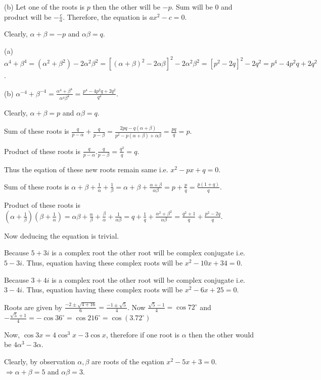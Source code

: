   (b) Let one of the roots is $p$ then the other will be $-p$. Sum will be $0$ and product will be
  $-\frac{c}{a}$. Therefore, the equation is $ax^2 - c = 0$.
\item Clearly, $\alpha + \beta = -p$ and $\alpha\beta = q$.

  (a) $\alpha^4 + \beta^4 = (\alpha^2 + \beta^2) - 2\alpha^2\beta^2 = [(\alpha + \beta)^2 - 2\alpha\beta]^2
  - 2\alpha^2\beta^2 = [p^2 - 2q]^2 - 2q^2 = p^4 - 4p^2q + 2q^2$.

  (b) $\alpha^{-4} + \beta^{-4} = \frac{\alpha^4 + \beta^4}{\alpha^4\beta^4} = \frac{p^4 - 4p^2q +
    2q^2}{q^4}$.
\item Clearly, $\alpha + \beta = p$ and $\alpha\beta = q$.
  \startitemize[i]
  \item Sum of these roots is $\frac{q}{p - \alpha} + \frac{q}{p - \beta} = \frac{2pq - q(\alpha +
    \beta)}{p^2 - p(\alpha + \beta) + \alpha\beta} = \frac{pq}{q} = p$.

    Product of these roots is $\frac{q}{p - \alpha}.\frac{q}{p - \beta} = \frac{q^2}{q} = q$.

    Thus the eqation of these new roots remain same i.e. $x^2 - px + q = 0$.
  \item Sum of these roots is $\alpha + \beta + \frac{1}{\alpha} + \frac{1}{\beta} = \alpha + \beta +
    \frac{\alpha + \beta}{\alpha\beta} = p + \frac{p}{q} = \frac{p(1 + q)}{q}$.

    Product of these roots is $\left(\alpha + \frac{1}{\beta}\right)\left(\beta + \frac{1}{\alpha}\right) =
    \alpha\beta + \frac{\alpha}{\beta} + \frac{\beta}{\alpha} + \frac{1}{\alpha\beta} = q + \frac{1}{q} +
    \frac{\alpha^2 + \beta^2}{\alpha\beta} = \frac{q^2 + 1}{q} + \frac{p^2 - 2q}{q}$.

    Now deducing the equation is trivial.
  \stopitemize
\item Because $5 + 3i$ is a complex root the other root will be complex conjugate i.e. $5 - 3i$. Thus,
  equation having these complex roots will be $x^2 - 10x + 34 = 0$.
\item Because $3 + 4i$ is a complex root the other root will be complex conjugate i.e. $3 - 4i$. Thus,
  equation having these complex roots will be $x^2 - 6x + 25 = 0$.
\item Roots are given by $\frac{-2\pm\sqrt{4 + 16}}{6} = \frac{-1\pm\sqrt{5}}{4}$. Now $\frac{\sqrt{5} -
  1}{4} = \cos72^\circ$ and $-\frac{\sqrt{5} + 1}{4} = -\cos36^\circ = \cos216^\circ = \cos(3.72^\circ)$

  Now, $\cos3x = 4\cos^3x - 3\cos x$, therefore if one root is $\alpha$ then the other would be $4\alpha^3 -
  3\alpha$.
\item Clearly, by observation $\alpha, \beta$ are roots of the eqation $x^2 - 5x + 3 = 0$. $\Rightarrow
  \alpha + \beta = 5$ and $\alpha\beta = 3$.

